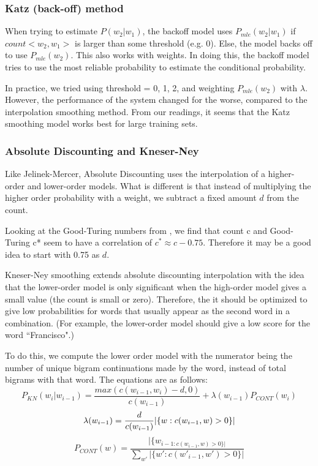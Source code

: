 \documentclass[10pt,twocolumn]{article}
\begin{document}
\subsubsection{Katz (back-off) method}
When trying to estimate $P(w_2|w_1)$, the backoff model\cite{katz1987estimation} uses $P_{mle}(w_2|w_1)$ if $count<w_2,w_1>$ is larger than some threshold (e.g. 0). Else, the model backs off to use $P_{mle}(w_2)$. This also works with weights. In doing this, the backoff model tries to use the most reliable probability to estimate the conditional probability.

In practice, we tried using threshold = 0, 1, 2, and weighting $P_{mle}(w_2)$ with $\lambda$. However, the performance of the system changed for the worse, compared to the interpolation smoothing method. From our readings, it seems that the Katz smoothing model works best for large training sets.
\subsubsection{Absolute Discounting and Kneser-Ney}
Like Jelinek-Mercer, Absolute Discounting uses the interpolation of a higher-order and lower-order models. What is different is that instead of multiplying the higher order probability with a weight, we subtract a fixed amount $d$ from the count. 

Looking at the Good-Turing numbers from \cite{church1991comparison}, we find that count c and Good-Turing c* seem to have a correlation of $c^*\approx c-0.75$. Therefore it may be a good idea to start with 0.75 as $d$.

Kneser-Ney smoothing extends absolute discounting interpolation with the idea that the lower-order model is only significant when the high-order model gives a small value (the count is small or zero). Therefore, the it should be optimized to give low probabilities for words that usually appear as the second word in a combination. (For example, the lower-order model should give a low score for the word ``Francisco".)

To do this, we compute the lower order model with the numerator being the number of unique bigram continuations made by the word, instead of total bigrams with that word. The equations are as follows:
\begin{equation*}
P_{KN}(w_i|w_{i-1})=\frac{max(c(w_{i-1},w_i)-d,0)}{c(w_{i-1})}+\lambda(w_{i-1})P_{CONT}(w_i)
\end{equation*}
\begin{equation*}
\lambda(w_{i-1}) = \frac{d}{c(w_{i-1})}|\{w:c(w_{i-1},w)>0\}|\\
\end{equation*}
\begin{equation*}
P_{CONT}(w) = \frac{|\{w_{i-1:c(w_{i-1},w)>0\}|}}{\sum_{w'}|\{w':c(w'_{i-1},w')>0\}|}
\end{equation*}
\end{document}
